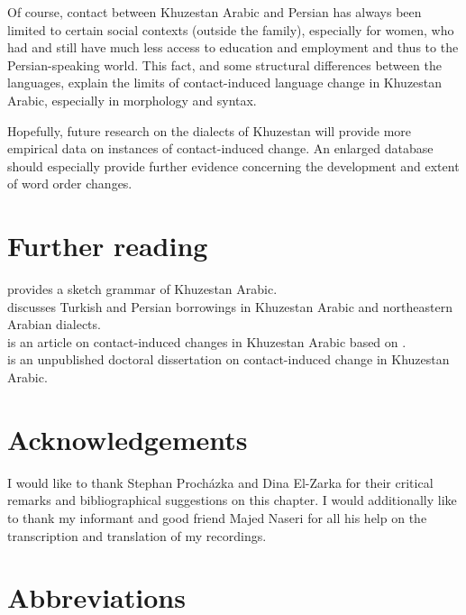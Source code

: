 \documentclass[output=paper,nonflat]{langsci/langscibook}
\begin{document}
Of course, contact between Khuzestan Arabic and Persian has always been limited to certain social contexts (outside the family), especially for women, who had and still have much less access to education and employment and thus to the Persian-speaking world. This fact, and some structural differences between the languages, explain the limits of contact-induced language change in Khuzestan Arabic, especially in morphology and syntax.

Hopefully, future research on the dialects of Khuzestan will provide more empirical data on instances of contact-induced change. An enlarged database should especially provide further evidence concerning the development and extent of word order changes.

\section*{Further reading}


\citet{Ingham2011khuz} provides a sketch grammar of Khuzestan Arabic.\\
\citet{Ingham2005} discusses Turkish and Persian borrowings in Khuzestan Arabic and northeastern Arabian dialects.\\
\citet{MatrasShabibi2007} is an article on contact-induced changes in Khuzestan Arabic based on \citet{Shabibi2006}.\\
\citet{Shabibi2006} is an unpublished doctoral dissertation on contact-induced change in Khuzestan Arabic.



\section*{Acknowledgements}

I would like to thank Stephan Procházka and Dina El-Zarka for their critical remarks and bibliographical suggestions on this chapter. I would additionally like to thank my informant and good friend Majed Naseri for all his help on the transcription and translation of my recordings.

\section*{Abbreviations}
\end{document}
